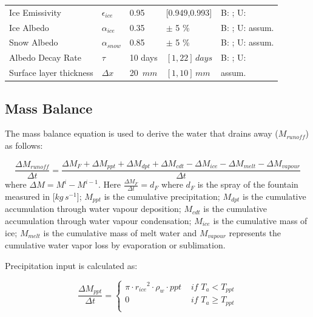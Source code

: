 \documentclass[utf8]{frontiersSCNS} %
\begin{document}
\begin{table}[h]
\begin{tabularx}{\linewidth}{ X l X l X  }
        Ice Emissivity        & $\epsilon_{ice}$ & 0.95 & [0.949,0.993] & B: \citeauthor{CuffeyPaterson_2010}; U:
        \citeauthor{HORI2006486}\\
        Ice Albedo         & $\alpha_{ice}$ & 0.35 & $\pm$ 5 \%  & B: \citeauthor{CuffeyPaterson_2010}; U: assum.   \\
        
        Snow Albedo        & $\alpha_{snow}$ & 0.85 & $\pm$ 5 \% & B: \citeauthor{CuffeyPaterson_2010}; U: assum.  \\
        Albedo Decay Rate & $\tau$ & 10 days & $[1,22]\, days$ & B: \citeauthor{Schmidt_2017}; U:
        \citeauthor{OerlemansKnap_1998}  \\ Surface layer thickness & $\Delta x$ & 20 $\,mm$ & $[1,10]\, mm$   & assum.\\
        
        \hline \end{tabularx} \label{table:parameters} \end{table} 


\subsection{Mass Balance} 
The mass balance equation is used to derive the water that drains away ($M_{runoff}$) as follows:

\begin{equation} \frac{\Delta M_{runoff}}{\Delta t} = \frac{\Delta M_{F} + \Delta M_{ppt} + \Delta M_{dpt} + \Delta
M_{cdt} - \Delta M_{ice} -\Delta M_{melt} - \Delta M_{vapour}}{\Delta t} \label{eqn:M} \end{equation}
where $\Delta M = M^{i} - M^{i-1}$. Here $\frac{\Delta M_{F}}{\Delta t} = d_F$ where $d_F$ is the spray of the
fountain measured in [$kg\,s^{-1}$]; $M_{ppt}$ is the cumulative precipitation; $M_{dpt}$ is the cumulative
accumulation through water vapour deposition; $M_{cdt}$ is the cumulative accumulation through water vapour
condensation; $M_{ice}$ is the cumulative mass of ice; $M_{melt}$ is the cumulative mass of melt water and
$M_{vapour}$ represents the cumulative water vapor loss by evaporation or sublimation. 

Precipitation input is calculated as:

\begin{equation} \frac{\Delta M_{ppt}}{\Delta t}  = \left\{ \begin{array}{ll} \pi \cdot {r_{ice}}^2 \cdot
\rho_{w}\cdot ppt& \textit{ if } T_{a} < T_{ppt} \\ 0 & \textit{ if } T_{a} \geq T_{ppt} \\ \end{array} \right.
    \end{equation}
\end{document}
